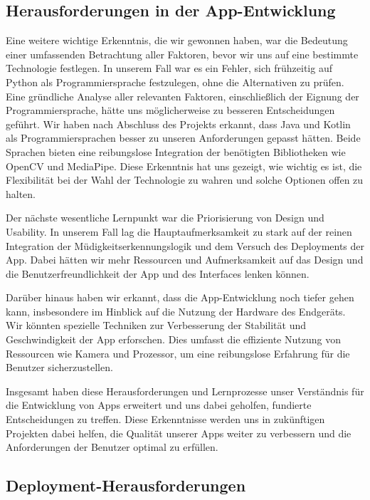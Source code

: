 \subsection{Herausforderungen in der App-Entwicklung}
	\label{ssec:llentwicklung}
	
	Eine weitere wichtige Erkenntnis, die wir gewonnen haben, war die Bedeutung einer umfassenden Betrachtung aller Faktoren, bevor wir uns auf eine bestimmte Technologie festlegen. In unserem Fall war es ein Fehler, sich frühzeitig auf Python als Programmiersprache festzulegen, ohne die Alternativen zu prüfen. Eine gründliche Analyse aller relevanten Faktoren, einschließlich der Eignung der Programmiersprache, hätte uns möglicherweise zu besseren Entscheidungen geführt. Wir haben nach Abschluss des Projekts erkannt, dass Java und Kotlin als Programmiersprachen besser zu unseren Anforderungen gepasst hätten. Beide Sprachen bieten eine reibungslose Integration der benötigten Bibliotheken wie OpenCV und MediaPipe. Diese Erkenntnis hat uns gezeigt, wie wichtig es ist, die Flexibilität bei der Wahl der Technologie zu wahren und solche Optionen offen zu halten.

	Der nächste wesentliche Lernpunkt war die Priorisierung von Design und Usability. In unserem Fall lag die Hauptaufmerksamkeit zu stark auf der reinen Integration der Müdigkeitserkennungslogik und dem Versuch des Deployments der App. Dabei hätten wir mehr Ressourcen und Aufmerksamkeit auf das Design und die Benutzerfreundlichkeit der App und des Interfaces lenken können. 
	
	Darüber hinaus haben wir erkannt, dass die App-Entwicklung noch tiefer gehen kann, insbesondere im Hinblick auf die Nutzung der Hardware des Endgeräts. Wir könnten spezielle Techniken zur Verbesserung der Stabilität und Geschwindigkeit der App erforschen. Dies umfasst die effiziente Nutzung von Ressourcen wie Kamera und Prozessor, um eine reibungslose Erfahrung für die Benutzer sicherzustellen.
	
	Insgesamt haben diese Herausforderungen und Lernprozesse unser Verständnis für die Entwicklung von Apps erweitert und uns dabei geholfen, fundierte Entscheidungen zu treffen. Diese Erkenntnisse werden uns in zukünftigen Projekten dabei helfen, die Qualität unserer Apps weiter zu verbessern und die Anforderungen der Benutzer optimal zu erfüllen.
	
\subsection{Deployment-Herausforderungen}
	\label{ssec:lldeployment}
	
